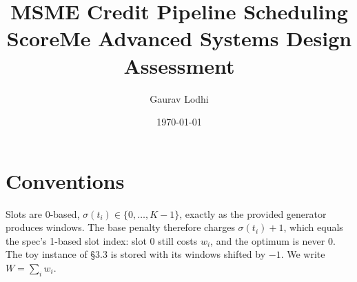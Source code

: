 \documentclass[11pt,a4paper]{article}
\title{MSME Credit Pipeline Scheduling\\\large ScoreMe Advanced Systems Design Assessment}
\author{Gaurav Lodhi}
\date{\today}
\begin{document}
\maketitle

\section*{Conventions}
Slots are 0-based, $\sigma(t_i) \in \{0,\dots,K-1\}$, exactly as the provided
generator produces windows. The base penalty therefore charges $\sigma(t_i)+1$,
which equals the spec's 1-based slot index: slot 0 still costs $w_i$, and the
optimum is never 0. The toy instance of \S3.3 is stored with its windows
shifted by $-1$. We write $W = \sum_i w_i$.









\end{document}

